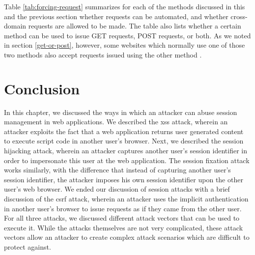 Table \ref{tab:forcing-request} summarizes for each of the methods discussed in this and the previous section whether requests can be automated, and whether cross-domain requests are allowed to be made. The table also lists whether a certain method can be used to issue GET requests, POST requests, or both. As we noted in section \ref{get-or-post}, however, some websites which normally use one of those two methods also accept requests issued using the other method \cite{Zeller2008}.

\section{Conclusion} %

In this chapter, we discussed the ways in which an attacker can abuse session management in web applications. We described the \gls{xss} attack, wherein an attacker exploits the fact that a web application returns user generated content to execute script code in another user's browser. Next, we described the \gls{session hijacking} attack, wherein an attacker captures another user's session identifier in order to impersonate this user at the web application. The \gls{session fixation} attack works similarly, with the difference that instead of capturing another user's session identifier, the attacker imposes his own session identifier upon the other user's web browser. We ended our discussion of session attacks with a brief discussion of the \gls{csrf} attack, wherein an attacker uses the implicit authentication in another user's browser to issue requests as if they came from the other user. For all three attacks, we discussed different attack vectors that can be used to execute it. While the attacks themselves are not very complicated, these attack vectors allow an attacker to create complex attack scenarios which are difficult to protect against.
